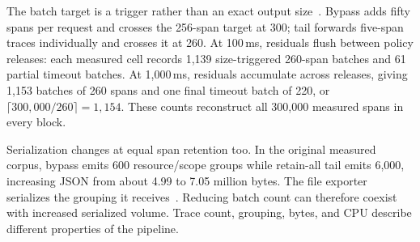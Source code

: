 The batch target is a trigger rather than an exact output size~\cite{otelBatchProcessor0136}. Bypass adds fifty spans per request and crosses the 256-span target at 300; tail forwards five-span traces individually and crosses it at 260. At 100\,ms, residuals flush between policy releases: each measured cell records 1,139 size-triggered 260-span batches and 61 partial timeout batches. At 1,000\,ms, residuals accumulate across releases, giving 1,153 batches of 260 spans and one final timeout batch of 220, or $\lceil300{,}000/260\rceil=1{,}154$. These counts reconstruct all 300,000 measured spans in every block.

Serialization changes at equal span retention too. In the original measured corpus, bypass emits 600 resource/scope groups while retain-all tail emits 6,000, increasing JSON from about 4.99 to 7.05 million bytes. The file exporter serializes the grouping it receives~\cite{otelFile0136}. Reducing batch count can therefore coexist with increased serialized volume. Trace count, grouping, bytes, and CPU describe different properties of the pipeline.

